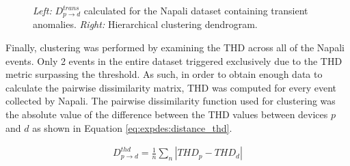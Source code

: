 \begin{figure}[ht!]
\begin{subfigure}{0.45\textwidth}
        \caption{}
        \label{fig:expdes:sub:cluster_trans:de}
    \end{subfigure}
    \caption{
    \textit{Left:} $D_{p \rightarrow d}^{trans}$ calculated for the Napali dataset containing transient anomalies.
    \textit{Right:} Hierarchical clustering dendrogram.
    }
    \label{fig:expdes:sub:cluster_trans}
\end{figure}

Finally, clustering was performed by examining the THD across all of the Napali events.
Only 2 events in the entire dataset triggered exclusively due to the THD metric surpassing the threshold.
As such, in order to obtain enough data to calculate the pairwise dissimilarity matrix, THD was computed for every event collected by Napali.
The pairwise dissimilarity function used for clustering was the absolute value of the difference between the THD values between devices $p$ and $d$ as shown in Equation \ref{eq:expdes:distance_thd}.

\begin{equation} \label{eq:expdes:distance_thd}
\begin{aligned}
    D_{p \rightarrow d}^{thd} = \frac{1}{n}\sum_{n}|THD_{p} - THD_{d}|
\end{aligned}
\end{equation}

